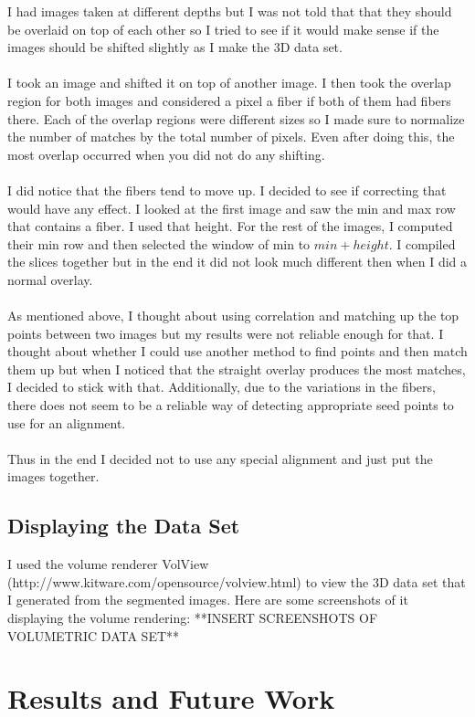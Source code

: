 \documentclass[11pt,psfig]{article}
\begin{document}
I had images taken at different depths but I was not told that that they should be overlaid on top of each other so I tried to see if it would make sense if the images should be shifted slightly as I make the 3D data set. \\
\\
I took an image and shifted it on top of another image. I then took the overlap region for both images and considered a pixel a fiber if both of them had fibers there. Each of the overlap regions were different sizes so I made sure to normalize the number of matches by the total number of pixels. Even after doing this, the most overlap occurred when you did not do any shifting. \\
\\
I did notice that the fibers tend to move up. I decided to see if correcting that would have any effect. I looked at the first image and saw the min and max row that contains a fiber. I used that height. For the rest of the images, I computed their min row and then selected the window of min to $min+height$. I compiled the slices together but in the end it did not look much different then when I did a normal overlay. \\
\\
As mentioned above, I thought about using correlation and matching up the top points between two images but my results were not reliable enough for that. I thought about whether I could use another method to find points and then match them up but when I noticed that the straight overlay produces the most matches, I decided to stick with that. Additionally, due to the variations in the fibers, there does not seem to be a reliable way of detecting appropriate seed points to use for an alignment. \\
\\
Thus in the end I decided not to use any special alignment and just put the images together. 

\subsection*{Displaying the Data Set}

I used the volume renderer VolView (http://www.kitware.com/opensource/volview.html) to view the 3D data set that I generated from the segmented images. Here are some screenshots of it displaying the volume rendering:
**INSERT SCREENSHOTS OF VOLUMETRIC DATA SET**

\section*{Results and Future Work}
\end{document}
